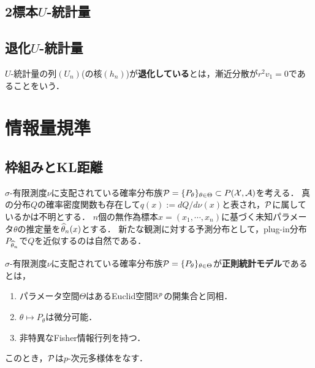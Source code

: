\documentclass[uplatex,dvipdfmx]{jsreport}
\begin{document}
\subsection{2標本$U$-統計量}

\subsection{退化$U$-統計量}

\begin{definition}[degenerated]
    $U$-統計量の列$(U_n)$(の核$(h_n)$)が\textbf{退化している}とは，漸近分散が$r^2v_1=0$であることをいう．
\end{definition}

\section{情報量規準}

\subsection{枠組みとKL距離}

\begin{notation}
    $\sigma$-有限測度$\nu$に支配されている確率分布族$\P=\{P_\theta\}_{\theta\in\Theta}\subset P(\X,\A)$を考える．
    真の分布$Q$の確率密度関数も存在して$q(x):=dQ/d\nu(x)$と表され，$\P$に属しているかは不明とする．
    $n$個の無作為標本$x=(x_1,\cdots,x_n)$に基づく未知パラメータ$\theta$の推定量を$\wh{\theta}_n(x)$とする．
    新たな観測に対する予測分布として，plug-in分布$P_{\wh{\theta}_n}$で$Q$を近似するのは自然である．
\end{notation}

\begin{definition}
    $\sigma$-有限測度$\nu$に支配されている確率分布族$\P=\{P_\theta\}_{\theta\in\Theta}$が\textbf{正則統計モデル}であるとは，
    \begin{enumerate}
        \item パラメータ空間$\Theta$はあるEuclid空間$\R^p$の開集合と同相．
        \item $\theta\mapsto P_\theta$は微分可能．
        \item 非特異なFisher情報行列を持つ．
    \end{enumerate}
    このとき，$\P$は$p$-次元多様体をなす．
\end{definition}
\end{document}
